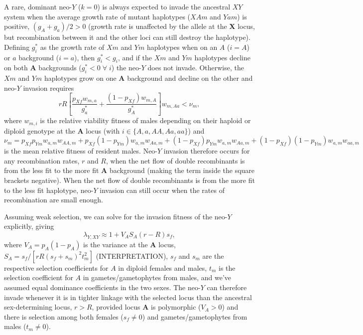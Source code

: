 \documentclass[12pt]{article}
\begin{document}
A rare, dominant neo-$Y$ ($k=0$) is always expected to invade the ancestral $XY$ system when the average growth rate of mutant haplotypes ($XAm$ and $Yam$) is positive, $(g_A + g_a)/2 > 0$ (growth rate is unaffected by the allele at the \textbf{X} locus, but recombination between it and the other loci can still destroy the haplotype). %
Defining $g_i^*$ as the growth rate of $Xm$ and $Ym$ haplotypes when on an $A$ ($i=A$) or $a$ background ($i=a$), then $g_i^* < g_i$, and if the $Xm$ and $Ym$ haplotypes decline on both \textbf{A} backgrounds ($g_i^* < 0 \; \forall \; i$) the neo-$Y$ does not invade.
Otherwise, the $Xm$ and $Ym$ haplotypes grow on one \textbf{A} background and decline on the other and neo-$Y$ invasion requires
\begin{equation}
r R \left[ \frac{p_{Xf} w_{m,a}}{g_a^*} + \frac{(1 - p_{Xf}) w_{m,A}}{g_A^*} \right] w_{m,Aa} < \nu_m,
\end{equation}
where $w_{m,i}$ is the relative viability fitness of males depending on their haploid or diploid genotype at the \textbf{A} locus (with $i\in\{A,a,AA,Aa,aa\}$) and
$\nu_m = 
  p_{Xf} p_{Ym} w_{a,m} w_{AA,m} +
  p_{Xf} (1-p_{Ym}) w_{a,m} w_{Aa,m} +
  (1-p_{Xf}) p_{Ym} w_{a,m} w_{Aa,m} +
  (1-p_{Xf}) (1-p_{Ym}) w_{a, m} w_{aa,m}$
is the mean relative fitness of resident males.
Neo-$Y$ invasion therefore occurs for any recombination rates, $r$ and $R$, when the net flow of double recombinants is from the less fit to the more fit \textbf{A} background (making the term inside the square brackets negative).
When the net flow of double recombinants is from the more fit to the less fit haplotype, neo-$Y$ invasion can still occur when the rates of recombination are small enough.

Assuming weak selection, we can solve for the invasion fitness of the neo-$Y$ explicitly, giving
\begin{equation}
\lambda_{Y,XY} \approx 1 + V_A S_A (r - R)s_f,
\end{equation}
where $V_A = p_A(1-p_A)$ is the variance at the \textbf{A} locus, $S_A = s_f/ \left[ r R \left( s_f + s_m \right)^2 t_m^2 \right]$ (INTERPRETATION), $s_f$ and $s_m$ are the respective selection coefficients for $A$ in diploid females and males, $t_m$ is the selection coefficient for $A$ in gametes/gametophytes from males, and we've assumed equal dominance coefficients in the two sexes.
The neo-$Y$ can therefore invade whenever it is in tighter linkage with the selected locus than the ancestral sex-determining locus, $r>R$, provided locus \textbf{A} is polymorphic ($V_A>0$) and there is selection among both females ($s_f\neq0$) and gametes/gametophytes from males ($t_m\neq0$).
\end{document}
